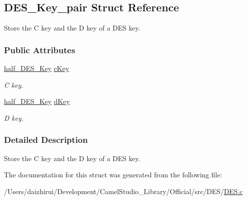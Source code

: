 \hypertarget{a00186}{}\subsection{D\+E\+S\+\_\+\+Key\+\_\+pair Struct Reference}
\label{a00186}


Store the C key and the D key of a D\+ES key.  


\subsubsection*{Public Attributes}
\begin{DoxyCompactItemize}
\item 
\mbox{\label{a00186_a862bbf6fe679a2210435a2a033841cb2}} 
\mbox{\hyperlink{a00023_ab8c38437466ac99c5915b0bb855abf75}{half\+\_\+\+D\+E\+S\+\_\+\+Key}} \mbox{\hyperlink{a00186_a862bbf6fe679a2210435a2a033841cb2}{c\+Key}}
\begin{DoxyCompactList}\small\item\em C key. \end{DoxyCompactList}\item 
\mbox{\label{a00186_ac3d0076c7117a20e997b93ad1aac490c}} 
\mbox{\hyperlink{a00023_ab8c38437466ac99c5915b0bb855abf75}{half\+\_\+\+D\+E\+S\+\_\+\+Key}} \mbox{\hyperlink{a00186_ac3d0076c7117a20e997b93ad1aac490c}{d\+Key}}
\begin{DoxyCompactList}\small\item\em D key. \end{DoxyCompactList}\end{DoxyCompactItemize}


\subsubsection{Detailed Description}
Store the C key and the D key of a D\+ES key. 

The documentation for this struct was generated from the following file\+:\begin{DoxyCompactItemize}
\item 
/\+Users/daizhirui/\+Development/\+Camel\+Studio\+\_\+\+Library/\+Official/src/\+D\+E\+S/\mbox{\hyperlink{a00023}{D\+E\+S.\+c}}\end{DoxyCompactItemize}

